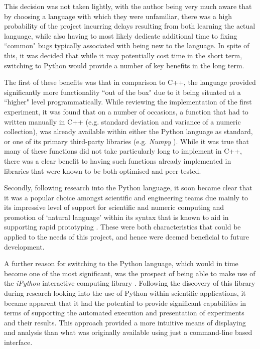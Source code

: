 This decision was not taken lightly, with the author being very much aware that by choosing a language with which they were unfamiliar, there was a high probability of the project incurring delays resulting from both learning the actual language, while also having to most likely dedicate additional time to fixing ``common" bugs typically associated with being new to the language. In spite of this, it was decided that while it may potentially cost time in the short term, switching to Python would provide a number of key benefits in the long term. 

The first of these benefits was that in comparison to C++, the language provided significantly more functionality ``out of the box" due to it being situated at a ``higher" level programmatically. While reviewing the implementation of the first experiment, it was found that on a number of occasions, a function that had to written manually in C++ (e.g. standard deviation and variance of a numeric collection), was already available within either the Python language as standard, or one of its primary third-party libraries (e.g. \textit{Numpy} \cite{numpy}). While it was true that many of these functions did not take particularly long to implement in C++, there was a clear benefit to having such functions already implemented in libraries that were known to be both optimised and peer-tested. 

Secondly, following research into the Python language, it soon became clear that it was a popular choice amongst scientific and engineering teams due mainly to its impressive level of support for scientific and numeric computing \cite{perez} and promotion of `natural language' within its syntax that is known to aid in supporting rapid prototyping \cite{ramanujam}. These were both characteristics that could be applied to the needs of this project, and hence were deemed beneficial to future development.


A further reason for switching to the Python language, which would in time become one of the most significant, was the prospect of being able to make use of the \textit{iPython} interactive computing library \cite{ipython}. Following the discovery of this library during research looking into the use of Python within scientific applications, it became apparent that it had the potential to provide significant capabilities in terms of supporting the automated execution and presentation of experiments and their results. This approach provided a more  intuitive means of displaying and analysis than what was originally available using just a command-line based interface. 

